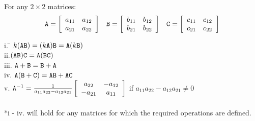 \begin{theorem}
	For any $2 \times 2$ matrices: \\
	\[\begin{array}{ccc}  \texttt{A}=\left[ \begin{array}{cc}a_{11}&a_{12}\\a_{21}&a_{22} \end{array} \right]  & \texttt{B}=\left[ \begin{array}{cc}b_{11}&b_{12}\\b_{21}&b_{22} \end{array} \right] & \texttt{C}=\left[ \begin{array}{cc}c_{11}&c_{12}\\c_{21}&c_{22} \end{array} \right] \end{array} \]
	\begin{tabbing}
		\indent i. \quad  \= $k(\texttt{AB}) = (k\texttt{A})\texttt{B}=\texttt{A}(k\texttt{B})$\\
		\indent ii.\>$(\texttt{AB})\texttt{C} = \texttt{A}(\texttt{BC}) $\\
		\indent iii. \> $\texttt{A}+\texttt{B}=\texttt{B}+\texttt{A}$ \\
		\indent iv. \> $\texttt{A}(\texttt{B}+\texttt{C})=\texttt{AB}+\texttt{AC}$\\
        \indent v. \> $\texttt{A}^{-1} = \frac{1}{a_{11}a_{22}-a_{12}a_{21}}\left[ \begin{array}{cc}a_{22}&-a_{12}\\-a_{21}&a_{11} \end{array} \right]$ if $a_{11}a_{22}-a_{12}a_{21} \neq 0$ \\
        \\
        *i - iv. will hold for any matrices for which the required operations are defined. 
	\end{tabbing}
\end{theorem}
\vspace{-.1in}\hspace{5in}\begin{annotation}
\end{annotation} 


